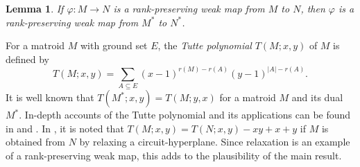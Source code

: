 \documentclass[12pt,reqno]{amsart}
\newtheorem{lemma}[theorem]{Lemma}
\theoremstyle{definition}
\theoremstyle{remark}
\numberwithin{equation}{section}
\begin{document}
\begin{lemma}
   If $\varphi: M\to N$ is a rank-preserving weak map from $M$ to $N$, then $\varphi$ is a rank-preserving weak map from $M^*$ to $N^*$. 
\end{lemma}

 For a matroid $M$ with ground set $E$, the \textit{Tutte polynomial} $T(M;x,y)$ of $M$ is defined by 
    \[
        T(M;x,y)=\displaystyle\sum_{A\subseteq E} (x-1)^{r(M)-r(A)}(y-1)^{|A|-r(A)}.
    \]
    It is well known that $T(M^*;x,y)=T(M;y,x)$ for a matroid $M$ and its dual $M^*$. In-depth accounts of the Tutte polynomial and its applications can be found in \cite{bry} and \cite{handbook}. In \cite[Exercise 6.10(b)]{bry}, it is noted that $T(M;x,y)=T(N;x,y)-xy+x+y$ if $M$ is obtained from $N$ by relaxing a circuit-hyperplane. Since relaxation is an example of a rank-preserving weak map, this adds to the plausibility of the main result.   
\end{document}
